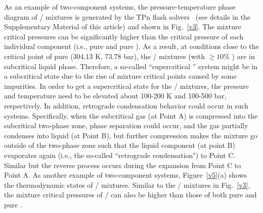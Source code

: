 As an example of two-component  systems, the pressure-temperature phase diagram of / mixtures is generated by the TPn flash solvers~\cite{michelsen1982isothermal} (see details in the Supplementary Material of this article) and shown in Fig.~\ref{v3}. %
The mixture critical pressures can be significantly higher than the critical pressure of each individual component (i.e., pure  and pure ).
As a result, at conditions close to the critical point of pure  (304.13 K, 73.78 bar), the / mixtures (with $\ge10\%$ ) are in subcritical liquid phase. Therefore, a so-called ``supercritical '' system might be in a subcritical state due to the rise of mixture critical points caused by some impurities. In order to get a supercritical state for the / mixtures, the pressure and temperature need to be elevated about 100-200 K and 100-500 bar, respectively. %
In addition, retrograde condensation behavior could occur in such systems. %
Specifically, when the subcritical gas (at Point A) is compressed into the subcritical two-phase zone, phase separation could occur, and the gas partially condenses into liquid (at Point B), but further compression makes the mixture go outside of the two-phase zone such that the liquid component (at point B) evaporates again (i.e., the so-called ``retrograde condensation") to Point C. Similar but the reverse process occurs during the expansion from Point C to Point A.
As another example of two-component  systems, Figure~\ref{v5}(a) shows the thermodynamic states of / mixtures. Similar to the / mixtures in Fig.~\ref{v3}, the mixture critical pressures of / can also be higher than those of both pure  and pure .

